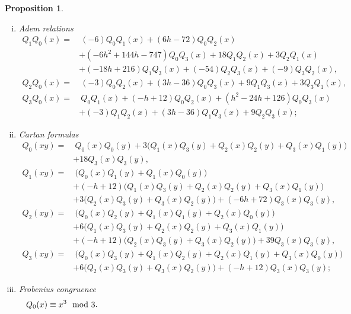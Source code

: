 \documentclass{gtpart}
\newtheorem{prop}[thm]{Proposition}
\theoremstyle{definition}
\theoremstyle{remark}
\newcommand{\md}{~~{\rm mod}~}
\begin{document}
\begin{prop}
\begin{enumerate}[(i)]
  \item Adem relations 
  \begin{equation*}
  \begin{split}
   Q_1Q_0(x) = & ~ (-6) Q_0Q_1(x) + (6 h - 72) Q_0Q_2(x) \\
               & + (-6 h^2 + 144 h - 747) Q_0Q_3(x) + 18 Q_1Q_2(x) + 3 Q_2Q_1(x) \\
               & + (-18 h + 216) Q_1Q_3(x) + (-54) Q_2Q_3(x) + (-9) Q_3Q_2(x), \\
   Q_2Q_0(x) = & ~ (-3) Q_0Q_2(x) + (3 h - 36) Q_0Q_3(x) + 9 Q_1Q_3(x) + 3 Q_3Q_1(x), \qquad \qquad \\
   Q_3Q_0(x) = & ~ Q_0Q_1(x) + (-h + 12) Q_0Q_2(x) + (h^2 - 24 h + 126) Q_0Q_3(x) \\
               & + (-3) Q_1Q_2(x) + (3 h - 36) Q_1Q_3(x) + 9 Q_2Q_3(x); 
  \end{split}
  \end{equation*}

  \item Cartan formulas 
  \begin{equation*}
  \begin{split}
   Q_0(xy) = & ~ Q_0(x) Q_0(y) + 3 \big(Q_1(x) Q_3(y) + Q_2(x) Q_2(y) + Q_3(x) Q_1(y)\big) \qquad \qquad \quad \\
             & + 18 Q_3(x) Q_3(y), \\
   Q_1(xy) = & ~ \big(Q_0(x) Q_1(y) + Q_1(x) Q_0(y)\big) \\
             & + (-h + 12) \big(Q_1(x) Q_3(y) + Q_2(x) Q_2(y) + Q_3(x) Q_1(y)\big) \\
             & + 3 \big(Q_2(x) Q_3(y) + Q_3(x) Q_2(y)\big) + (-6h + 72) Q_3(x) Q_3(y), \\
   Q_2(xy) = & ~ \big(Q_0(x) Q_2(y) + Q_1(x) Q_1(y) + Q_2(x) Q_0(y)\big) \\
             & + 6 \big(Q_1(x) Q_3(y) + Q_2(x) Q_2(y) + Q_3(x) Q_1(y)\big) \\
             & + (-h + 12) \big(Q_2(x) Q_3(y) + Q_3(x) Q_2(y)\big) + 39 Q_3(x) Q_3(y), \\
   Q_3(xy) = & ~ \big(Q_0(x) Q_3(y) + Q_1(x) Q_2(y) + Q_2(x) Q_1(y) + Q_3(x) Q_0(y)\big) \\
             & + 6 \big(Q_2(x) Q_3(y) + Q_3(x) Q_2(y)\big) + (-h + 12) Q_3(x) Q_3(y); 
  \end{split}
  \end{equation*}

  \item Frobenius congruence 
  \begin{equation*}
   Q_0(x) \equiv x^3 \md 3.  \qquad \qquad \qquad \qquad \qquad \qquad \qquad \qquad \qquad \qquad \qquad \qquad 
  \end{equation*}
 \end{enumerate}
\end{prop}
\end{document}
